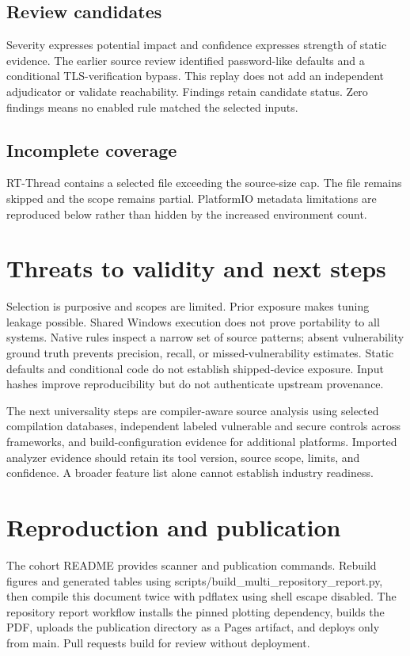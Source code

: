 \documentclass[11pt,a4paper]{article}
\begin{document}
\subsection{Review candidates}
\begin{itemize}\FindingItems\end{itemize}
Severity expresses potential impact and confidence expresses strength of static evidence. The earlier source review identified password-like defaults and a conditional TLS-verification bypass. This replay does not add an independent adjudicator or validate reachability. Findings retain candidate status. Zero findings means no enabled rule matched the selected inputs.
\subsection{Incomplete coverage}
RT-Thread contains a selected file exceeding the source-size cap. The file remains skipped and the scope remains partial. PlatformIO metadata limitations are reproduced below rather than hidden by the increased environment count.
\begin{itemize}\MetadataLimits\end{itemize}
\section{Threats to validity and next steps}
Selection is purposive and scopes are limited. Prior exposure makes tuning leakage possible. Shared Windows execution does not prove portability to all systems. Native rules inspect a narrow set of source patterns; absent vulnerability ground truth prevents precision, recall, or missed-vulnerability estimates. Static defaults and conditional code do not establish shipped-device exposure. Input hashes improve reproducibility but do not authenticate upstream provenance.

The next universality steps are compiler-aware source analysis using selected compilation databases, independent labeled vulnerable and secure controls across frameworks, and build-configuration evidence for additional platforms. Imported analyzer evidence should retain its tool version, source scope, limits, and confidence. A broader feature list alone cannot establish industry readiness.
\section{Reproduction and publication}
The cohort README provides scanner and publication commands. Rebuild figures and generated tables using scripts/build\_multi\_repository\_report.py, then compile this document twice with pdflatex using shell escape disabled. The repository report workflow installs the pinned plotting dependency, builds the PDF, uploads the publication directory as a Pages artifact, and deploys only from main. Pull requests build for review without deployment.
\end{document}
